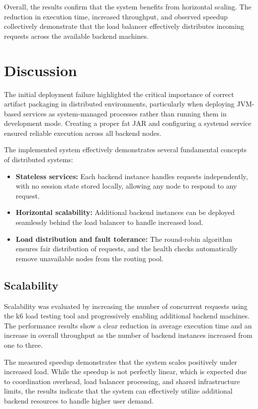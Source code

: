 \documentclass[conference]{IEEEtran}
\begin{document}
Overall, the results confirm that the system benefits from horizontal scaling. The reduction in execution time, increased throughput, and observed speedup collectively demonstrate that the load balancer effectively distributes incoming requests across the available backend machines.

\section{Discussion}

The initial deployment failure highlighted the critical importance of correct artifact packaging in distributed environments, particularly when deploying JVM-based services as system-managed processes rather than running them in development mode. Creating a proper fat JAR and configuring a systemd service ensured reliable execution across all backend nodes.

The implemented system effectively demonstrates several fundamental concepts of distributed systems:

\begin{itemize}
    \item \textbf{Stateless services:} Each backend instance handles requests independently, with no session state stored locally, allowing any node to respond to any request.
    \item \textbf{Horizontal scalability:} Additional backend instances can be deployed seamlessly behind the load balancer to handle increased load.
    \item \textbf{Load distribution and fault tolerance:} The round-robin algorithm ensures fair distribution of requests, and the health checks automatically remove unavailable nodes from the routing pool.
\end{itemize}

\subsection{Scalability}

Scalability was evaluated by increasing the number of concurrent requests using the k6 load testing tool and progressively enabling additional backend machines. The performance results show a clear reduction in average execution time and an increase in overall throughput as the number of backend instances increased from one to three.

The measured speedup demonstrates that the system scales positively under increased load. While the speedup is not perfectly linear, which is expected due to coordination overhead, load balancer processing, and shared infrastructure limits, the results indicate that the system can effectively utilize additional backend resources to handle higher user demand.
\end{document}
